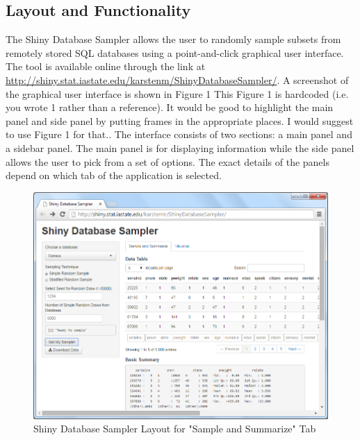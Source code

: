 \documentclass{article}\usepackage[]{graphicx}\usepackage[]{color}
\newcommand{\hh}[1]{{\color{ForestGreen} #1}}
\newcommand{\km}[1]{{\color{Orange} #1}}
\begin{document}


\subsection{Layout and Functionality}

The Shiny Database Sampler allows the user to randomly sample subsets from remotely stored SQL databases using a point-and-click graphical user interface. The tool is available online through the link at \url{http://shiny.stat.iastate.edu/karstenm/ShinyDatabaseSampler/}.  A screenshot of the graphical user interface is shown in Figure 1 \hh{This Figure 1 is hardcoded (i.e. you wrote 1 rather than a reference). It would be good to highlight the main panel and side panel by putting frames in the appropriate places. I would suggest to use Figure 1 for that.}.  The interface consists of two sections: a main panel and a sidebar panel. The main panel is for displaying information while the side panel allows the user to pick from  a set of  options. The exact details of the panels depend on which tab of the application is selected. %

\begin{figure}[htbp]
\centering
\includegraphics[keepaspectratio=TRUE,width=.75\textwidth]{figure/SampleAndSummarize.png}
\caption{Shiny Database Sampler Layout for "Sample and Summarize" Tab} 
\label{fig:samplesummarizetab}
\end{figure}
\end{document}
